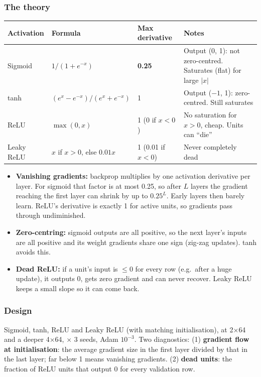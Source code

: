 \documentclass[11pt,a4paper]{article}
\begin{document}
\subsubsection*{The theory}
\begin{tabularx}{\linewidth}{@{}lllY@{}}
\toprule
Activation & Formula & Max derivative & Notes \\
\midrule
Sigmoid & $1/(1+e^{-x})$ & \textbf{0.25} & Output (0, 1): not zero-centred. Saturates (flat) for large $|x|$ \\
tanh & $(e^x - e^{-x})/(e^x + e^{-x})$ & 1 & Output ($-1$, 1): zero-centred. Still saturates \\
ReLU & $\max(0, x)$ & 1 (0 if $x<0$) & No saturation for $x>0$, cheap. Units can ``die'' \\
Leaky ReLU & $x$ if $x>0$, else $0.01x$ & 1 (0.01 if $x<0$) & Never completely dead \\
\bottomrule
\end{tabularx}
\begin{itemize}
  \item \textbf{Vanishing gradients:} backprop multiplies by one activation derivative per layer. For sigmoid that factor
        is at most 0.25, so after $L$ layers the gradient reaching the first layer can shrink by up to $0.25^L$. Early layers
        then barely learn. ReLU's derivative is exactly 1 for active units, so gradients pass through undiminished.
  \item \textbf{Zero-centring:} sigmoid outputs are all positive, so the next layer's inputs are all positive and its weight
        gradients share one sign (zig-zag updates). tanh avoids this.
  \item \textbf{Dead ReLU:} if a unit's input is $\leq 0$ for every row (e.g.\ after a huge update), it outputs 0, gets zero
        gradient and can never recover. Leaky ReLU keeps a small slope so it can come back.
\end{itemize}

\subsubsection*{Design}
Sigmoid, tanh, ReLU and Leaky ReLU (with matching initialisation), at 2$\times$64 and a deeper 4$\times$64, $\times$ 3
seeds, Adam $10^{-3}$. Two diagnostics: (1) \textbf{gradient flow at initialisation}: the average gradient size in the first
layer divided by that in the last layer; far below 1 means vanishing gradients. (2) \textbf{dead units}: the fraction of
ReLU units that output 0 for every validation row.
\end{document}
